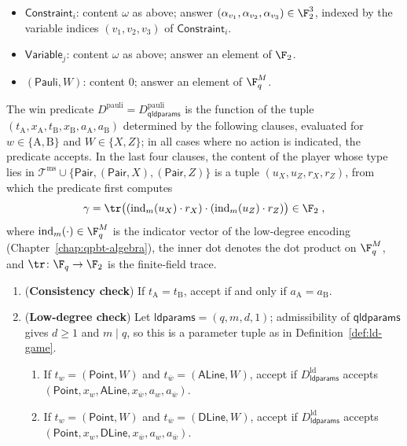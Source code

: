 \begin{definition}
\begin{itemize}
		\item $\mathsf{Constraint}_i$: content $\omega$ as above; answer $(\alpha_{v_1}, \alpha_{v_2}, \alpha_{v_3}) \in \F_2^3$, indexed by the variable indices $(v_1,v_2,v_3)$ of $\mathsf{Constraint}_i$.
		\item $\mathsf{Variable}_j$: content $\omega$ as above; answer an element of $\F_2$.
		\item $(\mathsf{Pauli},W)$: content $0$; answer an element of $\F_q^M$.
	\end{itemize}
	The win predicate $D^{\mathrm{pauli}} = D^{\mathrm{pauli}}_{\mathsf{qldparams}}$ is the function of the tuple $(t_{\mathrm A}, x_{\mathrm A}, t_{\mathrm B}, x_{\mathrm B}, a_{\mathrm A}, a_{\mathrm B})$ determined by the following clauses, evaluated for $w \in \{\mathrm A, \mathrm B\}$ and $W \in \{X,Z\}$; in all cases where no action is indicated, the predicate accepts. In the last four clauses, the content of the player whose type lies in $\mathcal T^{\mathrm{ms}} \cup \{\mathsf{Pair}, (\mathsf{Pair},X), (\mathsf{Pair},Z)\}$ is a tuple $(u_X, u_Z, r_X, r_Z)$, from which the predicate first computes
	\begin{equation}
		\label{eq:gamma-value}
		\gamma = \tr\bigl( (\mathrm{ind}_m(u_X) \cdot r_X) \cdot (\mathrm{ind}_m(u_Z) \cdot r_Z) \bigr) \in \F_2\;,
	\end{equation}
	where $\mathrm{ind}_m(\cdot) \in \F_q^M$ is the indicator vector of the low-degree encoding (Chapter~\ref{chap:qpbt-algebra}), the inner dot denotes the dot product on $\F_q^M$, and $\tr\colon \F_q \to \F_2$ is the finite-field trace.
	\begin{enumerate}
		\item (\textbf{Consistency check}) If $t_{\mathrm A} = t_{\mathrm B}$, accept if and only if $a_{\mathrm A} = a_{\mathrm B}$.
		\item (\textbf{Low-degree check}) Let $\mathsf{ldparams} = (q,m,d,1)$; admissibility of $\mathsf{qldparams}$ gives $d \ge 1$ and $m \mid q$, so this is a parameter tuple as in Definition~\ref{def:ld-game}.
		\begin{enumerate}
			\item If $t_w = (\mathsf{Point},W)$ and $t_{\overline w} = (\mathsf{ALine},W)$, accept if $D^{\mathrm{ld}}_{\mathsf{ldparams}}$ accepts $(\mathsf{Point}, x_w, \mathsf{ALine}, x_{\overline w}, a_w, a_{\overline w})$.
			\item If $t_w = (\mathsf{Point},W)$ and $t_{\overline w} = (\mathsf{DLine},W)$, accept if $D^{\mathrm{ld}}_{\mathsf{ldparams}}$ accepts $(\mathsf{Point}, x_w, \mathsf{DLine}, x_{\overline w}, a_w, a_{\overline w})$.

\end{enumerate}
\end{enumerate}
\end{definition}
